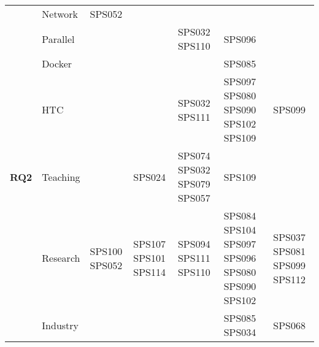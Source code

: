 \begin{table*}[htbp]
\begin{tabularx}{\textwidth}{p{0.8cm}p{2.5cm}>{\raggedright\arraybackslash}X>{\raggedright\arraybackslash}X>{\raggedright\arraybackslash}X>{\raggedright\arraybackslash}X>{\raggedright\arraybackslash}X}
		\addlinespace[0.3em]
		                                     & Network                 & SPS052             &                      &                             &                                                  &                             \\
		\addlinespace[0.3em]
		                                     & Parallel                &                    &                      & SPS032 SPS110               & SPS096                                           &                             \\
		\addlinespace[0.3em]
		                                     & Docker                  &                    &                      &                             & SPS085                                           &                             \\
		\addlinespace[0.3em]
		                                     & HTC                     &                    &                      & SPS032 SPS111               & SPS097 SPS080 SPS090 SPS102 SPS109               & SPS099                      \\
		\midrule
		\multirow{0}{*}[1.2em]{\textbf{RQ2}} & Teaching                &                    & SPS024               & SPS074 SPS032 SPS079 SPS057 & SPS109                                           &                             \\
		\addlinespace[0.3em]
		                                     & Research                & SPS100 SPS052      & SPS107 SPS101 SPS114 & SPS094 SPS111 SPS110        & SPS084 SPS104	SPS097 SPS096 SPS080 SPS090 SPS102 & SPS037 SPS081 SPS099 SPS112 \\
		\addlinespace[0.3em]
		                                     & Industry                &                    &                      &                             & SPS085 SPS034                                    & SPS068                      \\
		\bottomrule
	\end{tabularx}
\end{table*}

